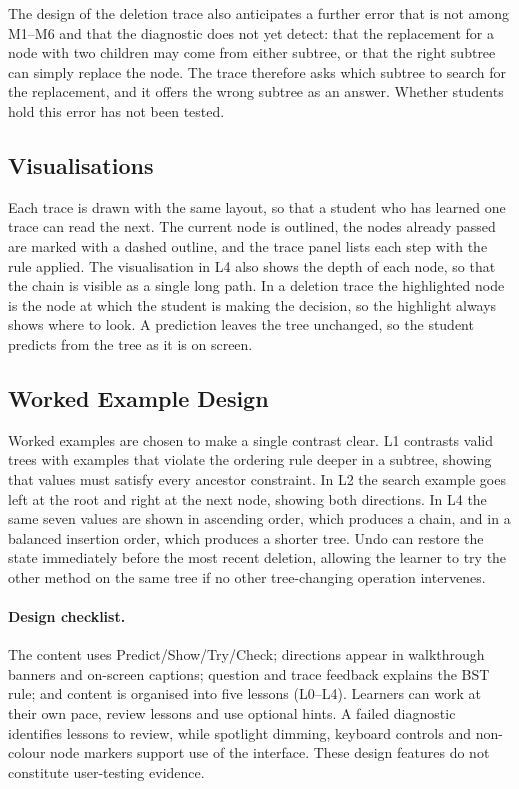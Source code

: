 The design of the deletion trace also anticipates a further error that is not among M1--M6 and that the diagnostic does not yet detect: that the replacement for a node with two children may come from either subtree, or that the right subtree can simply replace the node. The trace therefore asks which subtree to search for the replacement, and it offers the wrong subtree as an answer. Whether students hold this error has not been tested.

\subsection{Visualisations}
Each trace is drawn with the same layout, so that a student who has learned one trace can read the next. The current node is outlined, the nodes already passed are marked with a dashed outline, and the trace panel lists each step with the rule applied. The visualisation in L4 also shows the depth of each node, so that the chain is visible as a single long path. In a deletion trace the highlighted node is the node at which the student is making the decision, so the highlight always shows where to look. A prediction leaves the tree unchanged, so the student predicts from the tree as it is on screen.

\subsection{Worked Example Design}
Worked examples are chosen to make a single contrast clear. L1 contrasts valid trees with examples that violate the ordering rule deeper in a subtree, showing that values must satisfy every ancestor constraint. In L2 the search example goes left at the root and right at the next node, showing both directions. In L4 the same seven values are shown in ascending order, which produces a chain, and in a balanced insertion order, which produces a shorter tree. Undo can restore the state immediately before the most recent deletion, allowing the learner to try the other method on the same tree if no other tree-changing operation intervenes.
 
\paragraph{Design checklist.} The content uses Predict/Show/Try/Check; directions appear in walkthrough banners and on-screen captions; question and trace feedback explains the BST rule; and content is organised into five lessons (L0--L4). Learners can work at their own pace, review lessons and use optional hints. A failed diagnostic identifies lessons to review, while spotlight dimming, keyboard controls and non-colour node markers support use of the interface. These design features do not constitute user-testing evidence.
 
